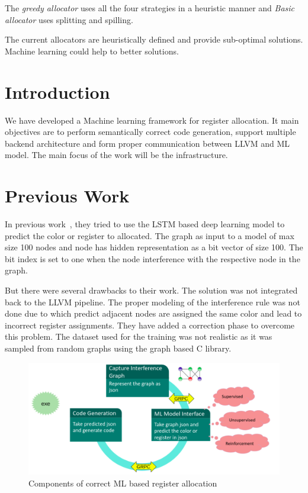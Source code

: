 The \textit{greedy allocator} uses all the four strategies in a heuristic manner and \textit{Basic allocator} uses splitting and spilling.

The current allocators are heuristically defined and provide sub-optimal solutions. Machine learning could help to better solutions.

\section{Introduction}\label{sec:mlra:intro}
We have developed a Machine learning framework for register allocation. It main objectives are to perform semantically correct code generation, support multiple backend architecture and form proper communication between LLVM and ML model. The main focus of the work will be the infrastructure.

\section{Previous Work}\label{sec:mlra:pre_work}
In previous work~\cite{dlra:LLVMHPC_2020}, they tried to use the LSTM based deep learning model to predict the color or register to allocated. The graph as input to a model of max size 100 nodes and node has hidden representation as a bit vector of size 100. The bit index is set to one when the node interference with the respective node in the graph. 

But there were several drawbacks to their work. The solution was not integrated back to the LLVM pipeline. The proper modeling of the interference rule was not done due to which predict adjacent nodes are assigned the same color and lead to incorrect register assignments. They have added a correction phase to overcome this problem. The dataset used for the training was not realistic as it was sampled from random graphs using the graph based C library.

\begin{figure}[t]
    \centering
    \includegraphics[scale=0.4]{figures/chapter-5/mlra_components.png}
    \caption{Components of correct ML based register allocation}
     \label{fig:mlra-components}
\end{figure}

